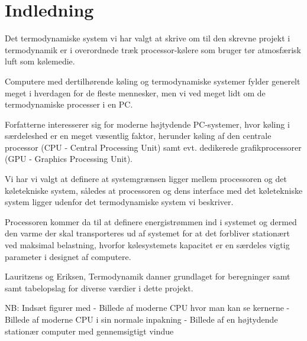 \section{Indledning}

Det termodynamiske system vi har valgt at skrive om til den skrevne projekt i termodynamik er i overordnede træk processor-kølere som bruger tør atmosfærisk luft som kølemedie.

Computere med dertilhørende køling og termodynamiske systemer fylder generelt meget i hverdagen for de fleste mennesker, men vi ved meget lidt om de termodynamiske processer i en PC.

Forfatterne interesserer sig for moderne højtydende PC-systemer, hvor køling i særdeleshed er en meget væsentlig faktor, herunder køling af den centrale processor (CPU - Central Processing Unit) samt evt. dedikerede grafikprocessorer (GPU - Graphics Processing Unit).

Vi har vi valgt at definere at systemgrænsen ligger mellem processoren og det køletekniske system, således at processoren og dens interface med det køletekniske system ligger udenfor det termodynamiske system vi beskriver.

Processoren kommer da til at definere energistrømmen ind i systemet og dermed den varme der skal transporteres ud af systemet for at det forbliver stationært ved maksimal belastning, hvorfor kølesystemets kapacitet er en særdeles vigtig parameter i designet af computere.

Lauritzens og Eriksen, Termodynamik danner grundlaget for beregninger samt samt tabelopslag for diverse værdier i dette projekt.

NB: Indsæt figurer med
- Billede af moderne CPU hvor man kan se kernerne
- Billede af moderne CPU i sin normale inpakning
- Billede af en højtydende stationær computer med gennemsigtigt vindue
